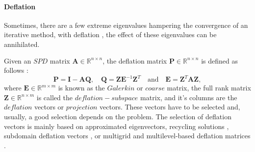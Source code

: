 \documentclass[times,final]{elsarticle}
\begin{document}
\paragraph{Deflation} Sometimes, there are a few extreme eigenvalues hampering the convergence of an iterative method, with deflation \cite{Vuik99}, the effect of these eigenvalues can be annihilated. \par
Given an $SPD$ matrix $\mathbf{A} \in \mathbb{R}^{n \times n}$, the deflation matrix $\mathbf{P} \in \mathbb{R}^{n \times n}$ is defined as follows \cite{Tang08,Tang09}:
\begin{equation}
\mathbf{P}=\mathbf{I}-\mathbf{A}\mathbf{Q}, \quad \mathbf{Q}=\mathbf{Z}\mathbf{E}^{-1}\mathbf{Z}^T \quad \text{and} \quad \mathbf{E}=\mathbf{Z}^T\mathbf{A}\mathbf{Z},
\end{equation}
where 
$\mathbf{E}\in \mathbb{R}^{m \times m}$ is known as the $Galerkin$ or $coarse$ matrix, the full rank matrix $\mathbf{Z}\in \mathbb{R}^{n\times m}$ is called the $deflation-subspace$ matrix, and it's columns are the
$deflation$ vectors or $projection$ vectors. 
These vectors have to be selected and, usually, a good selection depends on the problem. 
The selection of deflation vectors is mainly based on approximated eigenvectors, 
recycling solutions \cite{Clemens04,Diaz17}, subdomain deflation vectors \cite{Vuik02}, or multigrid and multilevel-based deflation matrices \cite{Tang09,Smith96}.
\end{document}
